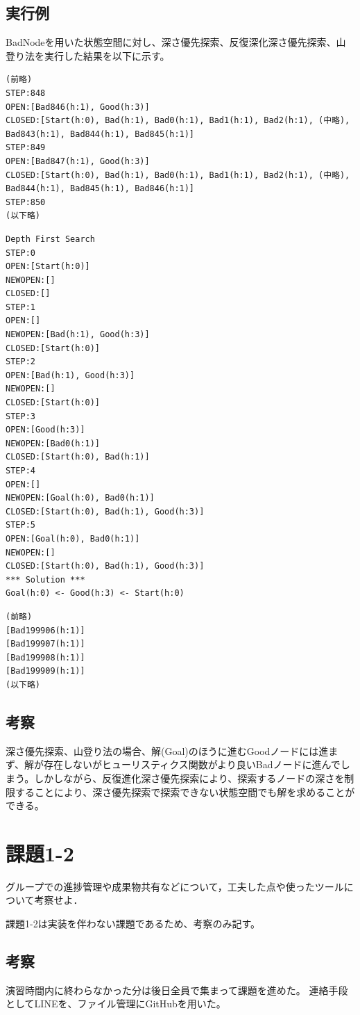 \documentclass{jarticle}
\begin{document}
\subsection{実行例}
BadNodeを用いた状態空間に対し、深さ優先探索、反復深化深さ優先探索、山登り法を実行した結果を以下に示す。

\begin{lstlisting}[caption=深さ優先探索]
(前略)
STEP:848
OPEN:[Bad846(h:1), Good(h:3)]
CLOSED:[Start(h:0), Bad(h:1), Bad0(h:1), Bad1(h:1), Bad2(h:1), (中略), Bad843(h:1), Bad844(h:1), Bad845(h:1)]
STEP:849
OPEN:[Bad847(h:1), Good(h:3)]
CLOSED:[Start(h:0), Bad(h:1), Bad0(h:1), Bad1(h:1), Bad2(h:1), (中略), Bad844(h:1), Bad845(h:1), Bad846(h:1)]
STEP:850
(以下略)
\end{lstlisting}

\begin{lstlisting}[caption=反復深化深さ優先探索]
Depth First Search
STEP:0
OPEN:[Start(h:0)]
NEWOPEN:[]
CLOSED:[]
STEP:1
OPEN:[]
NEWOPEN:[Bad(h:1), Good(h:3)]
CLOSED:[Start(h:0)]
STEP:2
OPEN:[Bad(h:1), Good(h:3)]
NEWOPEN:[]
CLOSED:[Start(h:0)]
STEP:3
OPEN:[Good(h:3)]
NEWOPEN:[Bad0(h:1)]
CLOSED:[Start(h:0), Bad(h:1)]
STEP:4
OPEN:[]
NEWOPEN:[Goal(h:0), Bad0(h:1)]
CLOSED:[Start(h:0), Bad(h:1), Good(h:3)]
STEP:5
OPEN:[Goal(h:0), Bad0(h:1)]
NEWOPEN:[]
CLOSED:[Start(h:0), Bad(h:1), Good(h:3)]
*** Solution ***
Goal(h:0) <- Good(h:3) <- Start(h:0)
\end{lstlisting}

\begin{lstlisting}[caption=山登り法]
(前略)
[Bad199906(h:1)]
[Bad199907(h:1)]
[Bad199908(h:1)]
[Bad199909(h:1)]
(以下略)
\end{lstlisting}

\subsection{考察}
深さ優先探索、山登り法の場合、解(Goal)のほうに進むGoodノードには進まず、解が存在しないがヒューリスティクス関数がより良いBadノードに進んでしまう。しかしながら、反復進化深さ優先探索により、探索するノードの深さを制限することにより、深さ優先探索で探索できない状態空間でも解を求めることができる。


\section{課題1-2}
\begin{screen}
  グループでの進捗管理や成果物共有などについて，工夫した点や使ったツールについて考察せよ．
\end{screen}

課題1-2は実装を伴わない課題であるため、考察のみ記す。

\subsection{考察}
  演習時間内に終わらなかった分は後日全員で集まって課題を進めた。
  連絡手段としてLINEを、ファイル管理にGitHubを用いた。
\end{document}
